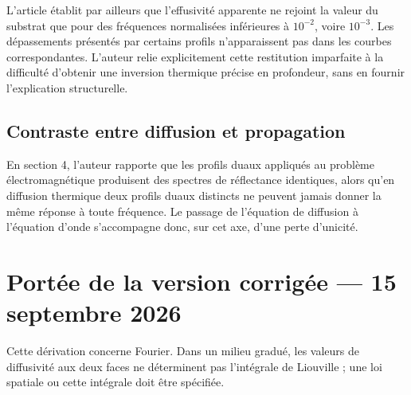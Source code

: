 \documentclass[11pt,a4paper]{article}
\begin{document}
L'article établit par ailleurs que l'effusivité apparente ne rejoint la valeur du substrat que pour des
fréquences normalisées inférieures à $10^{-2}$, voire $10^{-3}$. Les dépassements présentés par
certains profils n'apparaissent pas dans les courbes correspondantes. L'auteur relie explicitement
cette restitution imparfaite à la difficulté d'obtenir une inversion thermique précise en profondeur,
sans en fournir l'explication structurelle.

\subsection{Contraste entre diffusion et propagation}

En section 4, l'auteur rapporte que les profils duaux appliqués au problème électromagnétique
produisent des spectres de réflectance identiques, alors qu'en diffusion thermique deux profils duaux
distincts ne peuvent jamais donner la même réponse à toute fréquence. Le passage de l'équation de
diffusion à l'équation d'onde s'accompagne donc, sur cet axe, d'une perte d'unicité.
\section*{Portée de la version corrigée --- 15 septembre 2026}
Cette dérivation concerne Fourier. Dans un milieu gradué, les valeurs de diffusivité aux deux faces ne déterminent pas l'intégrale de Liouville ; une loi spatiale ou cette intégrale doit être spécifiée.
\end{document}

